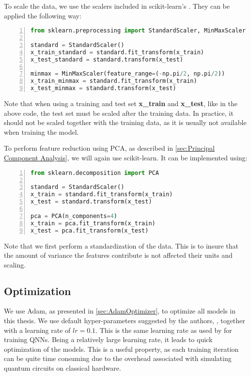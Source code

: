 To scale the data, we use the scalers included in scikit-learn's \cite{scikit-learn}. They can be applied the following way:
\begin{lstlisting}[language=python, numbers=left]
from sklearn.preprocessing import StandardScaler, MinMaxScaler

standard = StandardScaler()
x_train_standard = standard.fit_transform(x_train)
x_test_standard = standard.transform(x_test)

minmax = MinMaxScaler(feature_range=(-np.pi/2, np.pi/2))
x_train_minmax = standard.fit_transform(x_train)
x_test_minmax = standard.transform(x_test)
\end{lstlisting}
Note that when using a training and test set \textbf{x\_train} and \textbf{x\_test}, like in the above code, the test set must be scaled after the training data. In practice, it should not be scaled together with the training data, as it is usually not available when training the model.

To perform feature reduction using PCA, as described in \autoref{sec:Principal Component Analysis}, we will again use scikit-learn. It can be implemented using:

\begin{lstlisting}[language=python, numbers=left]
from sklearn.decomposition import PCA

standard = StandardScaler()
x_train = standard.fit_transform(x_train)
x_test = standard.transform(x_test)

pca = PCA(n_components=4)
x_train = pca.fit_transform(x_train)
x_test = pca.fit_transform(x_test)
\end{lstlisting}
Note that we first perform a standardization of the data. This is to insure that the amount of variance the features contribute is not affected their units and scaling.


\subsection{Optimization}\label{sec:Optimization}
We use Adam, as presented in \autoref{sec:AdamOptimizer}, to optimize all models in this thesis. We use default hyper-parameters suggested by the authors, \citet{kingma2017adam}, together with a learning rate of $lr=0.1$. This is the same learning rate as used by \citet{abbas2020power} for training QNNs. Being a relatively large learning rate, it leads to quick optimization of the models. This is a useful property, as each training iteration can be quite time consuming due to the overhead associated with simulating quantum circuits on classical hardware.

